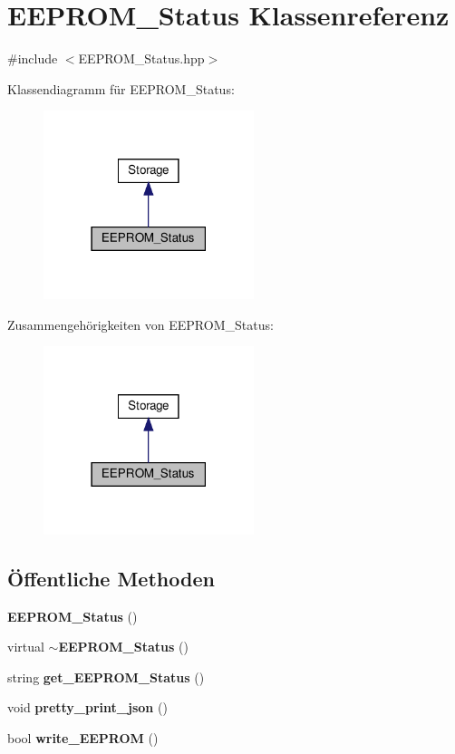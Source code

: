 \section{E\+E\+P\+R\+O\+M\+\_\+\+Status Klassenreferenz}
\label{class_e_e_p_r_o_m___status}


{\ttfamily \#include $<$E\+E\+P\+R\+O\+M\+\_\+\+Status.\+hpp$>$}



Klassendiagramm für E\+E\+P\+R\+O\+M\+\_\+\+Status\+:\nopagebreak
\begin{figure}[H]
\begin{center}
\leavevmode
\includegraphics[width=174pt]{class_e_e_p_r_o_m___status__inherit__graph}
\end{center}
\end{figure}


Zusammengehörigkeiten von E\+E\+P\+R\+O\+M\+\_\+\+Status\+:\nopagebreak
\begin{figure}[H]
\begin{center}
\leavevmode
\includegraphics[width=174pt]{class_e_e_p_r_o_m___status__coll__graph}
\end{center}
\end{figure}
\subsection*{Öffentliche Methoden}
\begin{DoxyCompactItemize}
\item 
\textbf{ E\+E\+P\+R\+O\+M\+\_\+\+Status} ()
\item 
virtual \textbf{ $\sim$\+E\+E\+P\+R\+O\+M\+\_\+\+Status} ()
\item 
string \textbf{ get\+\_\+\+E\+E\+P\+R\+O\+M\+\_\+\+Status} ()
\item 
void \textbf{ pretty\+\_\+print\+\_\+json} ()
\item 
bool \textbf{ write\+\_\+\+E\+E\+P\+R\+OM} ()
\end{DoxyCompactItemize}
